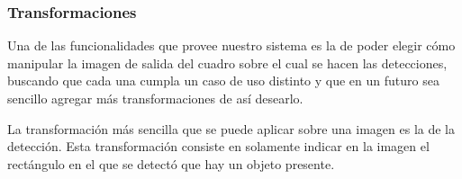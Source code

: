 \documentclass[a4paper]{article}
\begin{document}
\begin{figure}[H]
\end{figure}

\subsubsection{Transformaciones}

Una de las funcionalidades que provee nuestro sistema es la de poder elegir cómo manipular la imagen de salida del cuadro sobre el cual se hacen las detecciones, buscando que cada una cumpla un caso de uso distinto y que en un futuro sea sencillo agregar más transformaciones de así desearlo.

La transformación más sencilla que se puede aplicar sobre una imagen es la de la detección. Esta transformación consiste en solamente indicar en la imagen el rectángulo en el que se detectó que hay un objeto presente.
\end{document}
